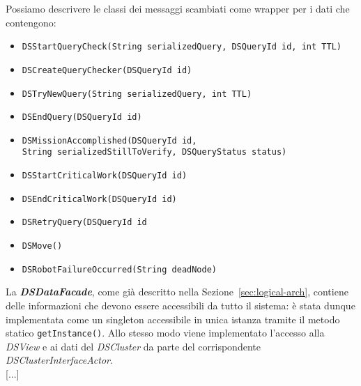Possiamo descrivere le classi dei messaggi scambiati come
wrapper per i dati che contengono:
\begin{itemize}
\item \texttt{DSStartQueryCheck(String serializedQuery,
  DSQueryId id, int TTL)}
\item \texttt{DSCreateQueryChecker(DSQueryId id)}
\item \texttt{DSTryNewQuery(String serializedQuery, int TTL)}
\item \texttt{DSEndQuery(DSQueryId id)}
\item \texttt{DSMissionAccomplished(DSQueryId id,\\
  \phantom{....}
  String serializedStillToVerify, DSQueryStatus status)}
\item \texttt{DSStartCriticalWork(DSQueryId id)}
\item \texttt{DSEndCriticalWork(DSQueryId id)}
\item \texttt{DSRetryQuery(DSQueryId id}
\item \texttt{DSMove()}
\item \texttt{DSRobotFailureOccurred(String deadNode)}
\end{itemize}

La \textbf{\emph{DSDataFacade}}, come già descritto nella
Sezione~\ref{sec:logical-arch}, contiene delle informazioni che devono
essere accessibili da tutto il sistema: è stata dunque implementata
come un singleton accessibile in unica istanza tramite il metodo statico
\texttt{getInstance()}.
Allo stesso modo viene implementato l'accesso alla \emph{DSView} e
ai dati del \emph{DSCluster} da parte del corrispondente
\emph{DSClusterInterfaceActor}.\\

[...]

